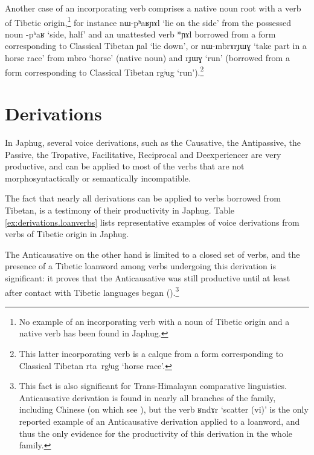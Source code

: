 \documentclass[oldfontcommands,oneside,a4paper,11pt]{article}
\newcommand{\ipa}[1]{{\phon \mbox{#1}}} %
\begin{document}
Another case of an incorporating verb comprises a native noun root with a verb of Tibetic origin,\footnote{No example of an incorporating verb with a noun of Tibetic origin and a native verb has been found in Japhug.} for instance  \ipa{nɯ-pʰaʁɲɤl} `lie on the side' from the possessed noun \ipa{-pʰaʁ} `side, half' and an unattested verb *\ipa{ɲɤl} borrowed from a form corresponding to Classical Tibetan \ipa{ɲal} `lie down', or \ipa{nɯ-mbrɤrɟɯɣ} `take part in a horse race' from \ipa{mbro} `horse' (native noun) and \ipa{rɟɯɣ} `run' (borrowed from a form corresponding to Classical Tibetan \ipa{rgʲug} `run').\footnote{This latter incorporating verb is a calque from a form corresponding to Classical Tibetan \ipa{rta rgʲug} `horse race'.}
  
\section{Derivations}
In Japhug, several voice derivations, such as the Causative, the Antipassive, the Passive, the Tropative, Facilitative, Reciprocal and Deexperiencer are very productive, and can be applied to most of the verbs that are not morphosyntactically or semantically incompatible. 


The fact that nearly all derivations can be applied to verbs borrowed from Tibetan, is a testimony of their productivity in Japhug. Table \ref{ex:derivations.loanverbs} lists representative examples of voice derivations from verbs of Tibetic origin in Japhug.

The Anticausative on the other hand is limited to a closed set of verbs, and the presence of a Tibetic loanword among verbs undergoing this derivation is significant: it proves that the Anticausative was still productive until at least after contact with Tibetic languages began (\citealt{jacques12demotion}).\footnote{This fact is also significant for Trans-Himalayan comparative linguistics. Anticausative derivation is found in nearly all branches of the family, including Chinese (on which see \citealt{sagart12sprefix}), but the verb \ipa{ʁndɤr} `scatter (vi)' is the only reported example of an Anticausative derivation applied to a loanword, and thus the only evidence for the productivity of this derivation in the whole family. }
\end{document}
